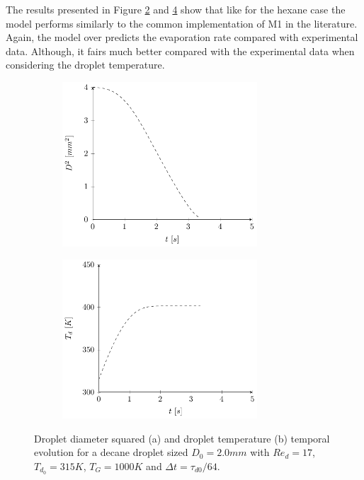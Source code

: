 \documentclass[../Interim_Report_Master]{subfiles}
\begin{document}
The results presented in Figure \ref{coupled_d2_decane_py} and \ref{coupled_heat_decane_py} show that like for the hexane case the model performs similarly to the common implementation of M1 in the literature. Again, the model over predicts the evaporation rate compared with experimental data. Although, it fairs much better compared with the experimental data when considering the droplet temperature.
\begin{figure}[H]
	\centering
	\begin{subfigure}{\textwidth}
		\centering
		\includegraphics[width=0.8\textwidth]{./Diagrams/Coupled_Heat_Mass_Transfer_Decane/Coupled_D2_Transfer_Decane.pdf}
		\caption{}
		\label{coupled_d2_decane_py}
	\end{subfigure}
\end{figure}
\begin{figure}\ContinuedFloat
	\centering
	\begin{subfigure}{\textwidth}
		\centering
		\includegraphics[width=0.8\textwidth]{./Diagrams/Coupled_Heat_Mass_Transfer_Decane/Coupled_Heat_Transfer_Decane.pdf}
		\caption{}
		\label{coupled_heat_decane_py}
	\end{subfigure}
	\caption{Droplet diameter squared (a) and droplet temperature (b) temporal evolution for a decane droplet sized $D_0=2.0mm$ with $Re_d=17$, $T_{d_0}=315K$, $T_G=1000K$ and $\Delta t=\tau_{d0}/64$.}
\end{figure}
\end{document}
